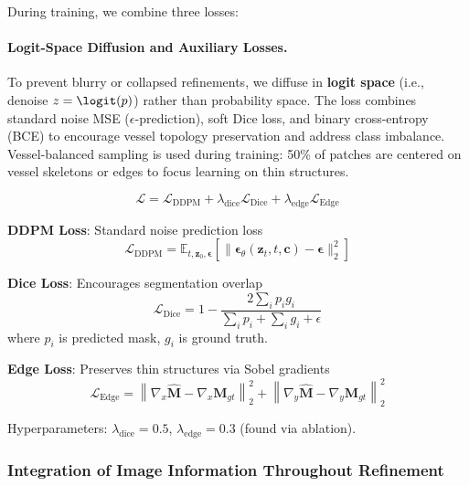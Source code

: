 \documentclass[11pt]{article}
\begin{document}
During training, we combine three losses:

\paragraph{Logit-Space Diffusion and Auxiliary Losses.}
To prevent blurry or collapsed refinements, we diffuse in \textbf{logit space} (i.e., denoise $z = \logit(p)$) rather than probability space. The loss combines standard noise MSE ($\epsilon$-prediction), soft Dice loss, and binary cross-entropy (BCE) to encourage vessel topology preservation and address class imbalance. Vessel-balanced sampling is used during training: 50\% of patches are centered on vessel skeletons or edges to focus learning on thin structures.

\begin{equation}
\mathcal{L} = \mathcal{L}_{\text{DDPM}} + \lambda_{\text{dice}} \mathcal{L}_{\text{Dice}} + \lambda_{\text{edge}} \mathcal{L}_{\text{Edge}}
\end{equation}

\textbf{DDPM Loss}: Standard noise prediction loss
\begin{equation}
\mathcal{L}_{\text{DDPM}} = \mathbb{E}_{t,\mathbf{z}_0,\boldsymbol{\epsilon}} \left[\|\boldsymbol{\epsilon}_\theta(\mathbf{z}_t, t, \mathbf{c}) - \boldsymbol{\epsilon}\|_2^2\right]
\end{equation}

\textbf{Dice Loss}: Encourages segmentation overlap
\begin{equation}
\mathcal{L}_{\text{Dice}} = 1 - \frac{2 \sum_i p_i g_i}{\sum_i p_i + \sum_i g_i + \epsilon}
\end{equation}
where $p_i$ is predicted mask, $g_i$ is ground truth.

\textbf{Edge Loss}: Preserves thin structures via Sobel gradients
\begin{equation}
\mathcal{L}_{\text{Edge}} = \left\|\nabla_x \hat{\mathbf{M}} - \nabla_x \mathbf{M}_{gt}\right\|_2^2 + \left\|\nabla_y \hat{\mathbf{M}} - \nabla_y \mathbf{M}_{gt}\right\|_2^2
\end{equation}

Hyperparameters: $\lambda_{\text{dice}} = 0.5$, $\lambda_{\text{edge}} = 0.3$ (found via ablation).

\subsubsection{Integration of Image Information Throughout Refinement}
\end{document}

